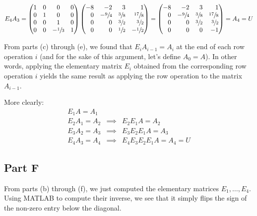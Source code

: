 \documentclass[12pt]{article}
\begin{document}
$$
E_4A_3 = \begin{pmatrix*}[c]
    1 & 0 & 0 & 0 \\
    0 & 1 & 0 & 0 \\
    0 & 0 & 1 & 0 \\
    0 & 0 & -\sfrac{1}{3} & 1
\end{pmatrix*}
\begin{pmatrix*}[r]
    -8 & -2 & 3 & 1 \\
    0 & -\sfrac{9}{4} & \sfrac{3}{8}  & \sfrac{17}{8} \\
    0 & 0 & \sfrac{3}{2} & \sfrac{3}{2} \\
    0 & 0 & \sfrac{1}{2} & -\sfrac{1}{2}
\end{pmatrix*}
= \begin{pmatrix*}[r]
    -8 & -2 & 3 & 1 \\
    0 & -\sfrac{9}{4} & \sfrac{3}{8}  & \sfrac{17}{8} \\
    0 & 0 & \sfrac{3}{2} & \sfrac{3}{2} \\
    0 & 0 & 0 & -1
\end{pmatrix*}
= A_4 = U
$$

From parts (c) through (e), we found that $E_iA_{i-1} = A_i$ at the end of each row operation $i$ (and for the sake of this argument, let's define $A_0=A$). In other words, applying the elementary matrix $E_i$ obtained from the corresponding row operation $i$ yields the same result as applying the row operation to the matrix $A_{i-1}$.

More clearly:
$$
\begin{array}{rcl}
    E_1A = A_1 \\
    E_2A_1 = A_2 &\implies& E_2E_1A = A_2 \\
    E_3A_2 = A_3 &\implies& E_3E_2E_1A = A_3 \\
    E_4A_3 = A_4 &\implies& E_4E_3E_2E_1A = A_4 = U
\end{array}
$$

\subsection*{Part F}

From parts (b) through (f), we just computed the elementary matrices $E_1,\ldots,E_4$. Using MATLAB to compute their inverse, we see that it simply flips the sign of the non-zero entry below the diagonal.
\end{document}
